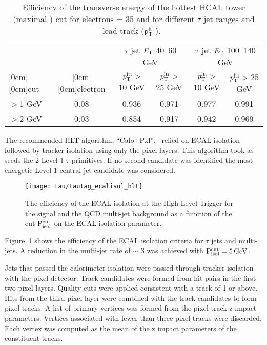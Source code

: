 \begin{table}[tb]
  \begin{tabular}{|l|c|c|c|c|c|}
   \hline
& & \multicolumn{2}{|c|}{$\tau$ jet $E_{\rm T}$ 40--60 GeV} &
    \multicolumn{2}{|c|}{$\tau$ jet $E_{\rm T}$ 100--140 GeV} \\
    \cline{3-6}
    \raisebox{1.5ex}[0cm][0cm]{cut} &
    \raisebox{1.5ex}[0cm][0cm]{electron} &
        $p_{\rm T}^{\rm ltr}>$ 10 GeV &
        $p_{\rm T}^{\rm ltr}>$ 25 GeV &
        $p_{\rm T}^{\rm ltr}>$ 10 GeV &
        $p_{\rm T}^{\rm ltr}>$ 25 GeV \\
   \hline
$>$1 GeV & 0.08 & 0.936 & 0.971 & 0.977 & 0.991 \\
   \hline
$>$2 GeV & 0.03 & 0.854 & 0.917 & 0.942 & 0.969 \\
   \hline
  \end{tabular}
  \caption{Efficiency of the transverse energy of the hottest
           HCAL tower (maximal \ET) cut for electrons \PT = 35 \GeVc and
           for different $\tau$ jet \PT ranges and lead track \PT ($\mathrm{p _{\rm T} ^{\rm ltr}}$).~\cite{CMS_TDR_PHYS_vol1, citeulike:800614}}
  \label{tab:tautag_etau_reject}
\end{table}

The recommended HLT algorithm, ``Calo+Pxl'',~\cite{CMS_TDR_PHYS_vol1, citeulike:800614} relied on ECAL isolation followed by tracker isolation using only the pixel layers. This algorithm took as seeds the 2 Level-1 $\tau$ primitives. If no second candidate was identified the most energetic Level-1 central jet candidate was considered.

\begin{figure}[tb]
\centering
\texttt{[image: tau/tautag\_ecalisol\_hlt]}
\caption{The efficiency of the ECAL isolation at the High Level Trigger for 
         the signal and the QCD multi-jet background as a function of the cut 
         $\mathrm{P _{\rm isol}^{\rm cut}}$ on the ECAL isolation parameter.~\cite{CMS_TDR_PHYS_vol1, citeulike:800614} }
\label{fig:tautag_ecalisol_hlt}
\end{figure}

Figure~\ref{fig:tautag_ecalisol_hlt} shows the efficiency of the ECAL isolation criteria for $\tau$ jets and multi-jets. A reduction in the multi-jet rate of $\sim$ 3 was achieved with $\mathrm{P_{isol}^{cut}} = 5 \,\mathrm{Ge\hspace{-.08em}V}$.

Jets that passed the calorimeter isolation were passed through tracker isolation with the pixel detector. Track candidates were formed from hit pairs in the first two pixel layers. Quality cuts were applied consistent with a track \PT of 1 \GeVc or above. Hits from the third pixel layer were combined with the track candidates to form pixel-tracks. A list of primary vertices was formed from the pixel-track z impact parameters. Vertices associated with fewer than three pixel-tracks were discarded. Each vertex was computed as the mean of the z impact parameters of the constituent tracks.

